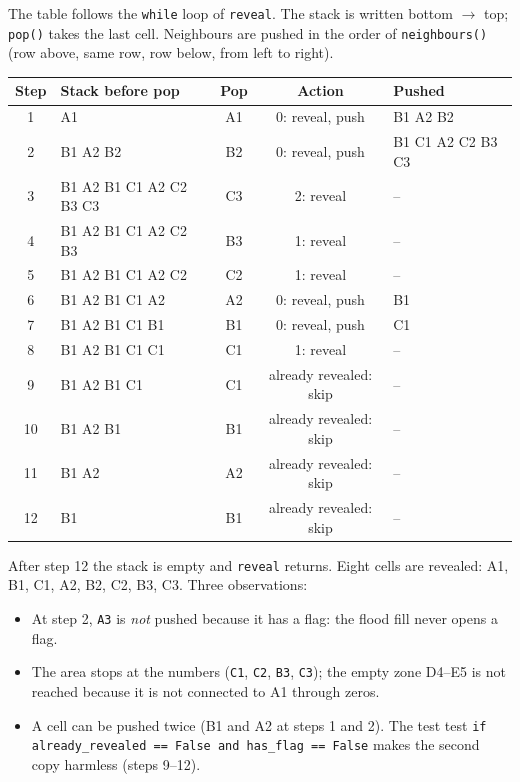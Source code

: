 \documentclass[11pt,a4paper]{article}
\newcommand{\code}[1]{\texttt{#1}}
\begin{document}
The table follows the \code{while} loop of \code{reveal}. The stack is written bottom $\rightarrow$ top;
\code{pop()} takes the last cell. Neighbours are pushed in the order of \code{neighbours()}
(row above, same row, row below, from left to right).

{\small
\begin{longtable}{c >{\ttfamily}p{5.6cm} >{\ttfamily}c c >{\ttfamily}p{3.3cm}}
\toprule
\textbf{Step} & \textrm{\textbf{Stack before pop}} & \textrm{\textbf{Pop}} & \textbf{Action} & \textrm{\textbf{Pushed}}\\
\midrule
1 & A1 & A1 & 0: reveal, push & B1 A2 B2\\
2 & B1 A2 B2 & B2 & 0: reveal, push & B1 C1 A2 C2 B3 C3\\
3 & B1 A2 B1 C1 A2 C2 B3 C3 & C3 & 2: reveal & --\\
4 & B1 A2 B1 C1 A2 C2 B3 & B3 & 1: reveal & --\\
5 & B1 A2 B1 C1 A2 C2 & C2 & 1: reveal & --\\
6 & B1 A2 B1 C1 A2 & A2 & 0: reveal, push & B1\\
7 & B1 A2 B1 C1 B1 & B1 & 0: reveal, push & C1\\
8 & B1 A2 B1 C1 C1 & C1 & 1: reveal & --\\
9 & B1 A2 B1 C1 & C1 & already revealed: skip & --\\
10 & B1 A2 B1 & B1 & already revealed: skip & --\\
11 & B1 A2 & A2 & already revealed: skip & --\\
12 & B1 & B1 & already revealed: skip & --\\
\bottomrule
\end{longtable}}

\noindent After step 12 the stack is empty and \code{reveal} returns. Eight cells are revealed:
A1, B1, C1, A2, B2, C2, B3, C3. Three observations:
\begin{itemize}
\item At step 2, \code{A3} is \emph{not} pushed because it has a flag: the flood fill never opens a flag.
\item The area stops at the numbers (\code{C1}, \code{C2}, \code{B3}, \code{C3}); the empty zone
  D4--E5 is not reached because it is not connected to A1 through zeros.
\item A cell can be pushed twice (B1 and A2 at steps 1 and 2). The test
  test \code{if already\_revealed == False and has\_flag == False} makes the second copy harmless (steps 9--12).
\end{itemize}
\end{document}
